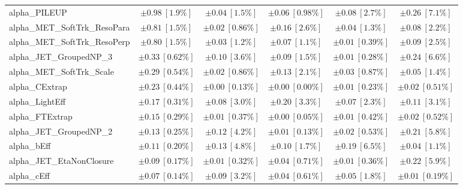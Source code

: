 \begin{sidewaystable}
\begin{center}
\begin{tabular*}{\textwidth}{@{\extracolsep{\fill}}lccccc}
alpha\_PILEUP         & $\pm 0.98\ [1.9\%] $          & $\pm 0.04\ [1.5\%] $          & $\pm 0.06\ [0.98\%] $          & $\pm 0.08\ [2.7\%] $          & $\pm 0.26\ [7.1\%] $       \\
alpha\_MET\_SoftTrk\_ResoPara         & $\pm 0.81\ [1.5\%] $          & $\pm 0.02\ [0.86\%] $          & $\pm 0.16\ [2.6\%] $          & $\pm 0.04\ [1.3\%] $          & $\pm 0.08\ [2.2\%] $       \\
alpha\_MET\_SoftTrk\_ResoPerp         & $\pm 0.80\ [1.5\%] $          & $\pm 0.03\ [1.2\%] $          & $\pm 0.07\ [1.1\%] $          & $\pm 0.01\ [0.39\%] $          & $\pm 0.09\ [2.5\%] $       \\
alpha\_JET\_GroupedNP\_3         & $\pm 0.33\ [0.62\%] $          & $\pm 0.10\ [3.6\%] $          & $\pm 0.09\ [1.5\%] $          & $\pm 0.01\ [0.28\%] $          & $\pm 0.24\ [6.6\%] $       \\
alpha\_MET\_SoftTrk\_Scale         & $\pm 0.29\ [0.54\%] $          & $\pm 0.02\ [0.86\%] $          & $\pm 0.13\ [2.1\%] $          & $\pm 0.03\ [0.87\%] $          & $\pm 0.05\ [1.4\%] $       \\
alpha\_CExtrap         & $\pm 0.23\ [0.44\%] $          & $\pm 0.00\ [0.13\%] $          & $\pm 0.00\ [0.00\%] $          & $\pm 0.01\ [0.23\%] $          & $\pm 0.02\ [0.51\%] $       \\
alpha\_LightEff         & $\pm 0.17\ [0.31\%] $          & $\pm 0.08\ [3.0\%] $          & $\pm 0.20\ [3.3\%] $          & $\pm 0.07\ [2.3\%] $          & $\pm 0.11\ [3.1\%] $       \\
alpha\_FTExtrap         & $\pm 0.15\ [0.29\%] $          & $\pm 0.01\ [0.37\%] $          & $\pm 0.00\ [0.05\%] $          & $\pm 0.01\ [0.42\%] $          & $\pm 0.02\ [0.52\%] $       \\
alpha\_JET\_GroupedNP\_2         & $\pm 0.13\ [0.25\%] $          & $\pm 0.12\ [4.2\%] $          & $\pm 0.01\ [0.13\%] $          & $\pm 0.02\ [0.53\%] $          & $\pm 0.21\ [5.8\%] $       \\
alpha\_bEff         & $\pm 0.11\ [0.20\%] $          & $\pm 0.13\ [4.8\%] $          & $\pm 0.10\ [1.7\%] $          & $\pm 0.19\ [6.5\%] $          & $\pm 0.04\ [1.1\%] $       \\
alpha\_JET\_EtaNonClosure         & $\pm 0.09\ [0.17\%] $          & $\pm 0.01\ [0.32\%] $          & $\pm 0.04\ [0.71\%] $          & $\pm 0.01\ [0.36\%] $          & $\pm 0.22\ [5.9\%] $       \\
alpha\_cEff         & $\pm 0.07\ [0.14\%] $          & $\pm 0.09\ [3.2\%] $          & $\pm 0.04\ [0.61\%] $          & $\pm 0.05\ [1.8\%] $          & $\pm 0.01\ [0.19\%] $       \\

\end{tabular*}
\end{center}
\end{sidewaystable}
